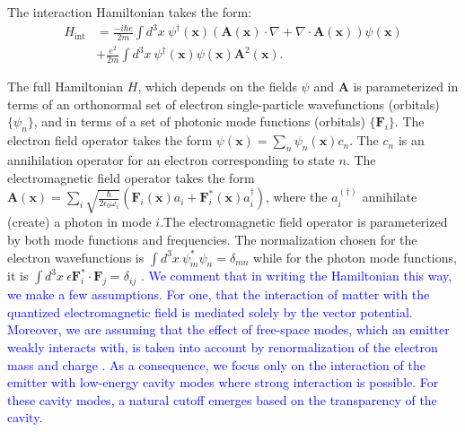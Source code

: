 \documentclass[aps,prl,twocolumn,
	groupedaddress,superscriptaddress,
	amsfonts,amssymb,amsmath,floatfix,
	citeautoscript]{revtex4-1}
\begin{document}
The interaction Hamiltonian takes the form:
\begin{align}
H_{\mathrm{int}} &= \frac{-i\hbar e}{2m}\int d^3x ~\psi^{\dagger}(\mathbf{x})(\mathbf{A}(\mathbf{x})\cdot\nabla +  \nabla \cdot \mathbf{A}(\mathbf{x}))\psi(\mathbf{x}) \nonumber \\ &+ \frac{e^2}{2m}\int d^3x ~\psi^{\dagger}(\mathbf{x})\psi(\mathbf{x})\mathbf{A}^2(\mathbf{x}).
\end{align}

The full Hamiltonian $H$, which depends on the fields $\psi$ and $\mathbf{A}$ is parameterized in terms of an orthonormal set of electron single-particle wavefunctions (orbitals) $\{\psi_n\}$, and in terms of a set of photonic mode functions (orbitals) $\{\mathbf{F}_i\}$. The electron field operator takes the form $\psi(\mathbf{x}) = \sum_n \psi_n(\mathbf{x})c_n$.
The $c_n$ is an annihilation operator for an electron corresponding to state $n$. The electromagnetic field operator takes the form $\mathbf{A}(\mathbf{x}) = \sum_i\sqrt{\frac{\hbar}{2\epsilon_0\omega_i}} \left(\mathbf{F}_i(\mathbf{x})a_i+\mathbf{F}^*_i(\mathbf{x})a^{\dagger}_i\right)$, where the $a_i^{(\dagger)}$ annihilate (create) a photon in mode $i$.The electromagnetic field operator is parameterized by both mode functions and  frequencies. The normalization chosen for the electron wavefunctions is $\int d^3x~ \psi_m^*\psi_n = \delta_{mn}$ while for the photon mode functions, it is $\int d^3x~\epsilon\mathbf{F}_i^*\cdot\mathbf{F}_j = \delta_{ij}$ \cite{joannopoulos2011photonic}. \textcolor{blue}{We comment that in writing the Hamiltonian this way, we make a few assumptions. For one, that the interaction of matter with the quantized electromagnetic field is mediated solely by the vector potential. Moreover, we are assuming that the effect of free-space modes, which an emitter weakly interacts with, is taken into account {\color{red}by} renormalization of the electron mass and charge \cite{milonni1976semiclassical}{\color{red}. As a consequence}, we focus only on the interaction of the emitter with low-energy cavity modes where strong interaction is possible. For these cavity modes, a natural cutoff emerges based on the transparency of the cavity.}
\end{document}
